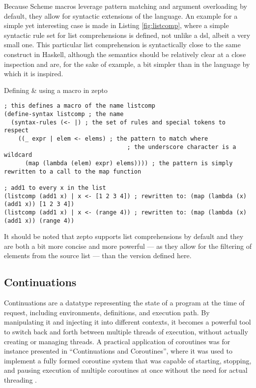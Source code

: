 \documentclass[oneside,11pt,xetex]{scrbook}
\begin{document}
Because Scheme macros leverage pattern matching and argument overloading by default,
they allow for syntactic extensions of the language. An example for a simple yet
interesting case is made in Listing \ref{fig:listcomp}, where a simple syntactic rule set
for list comprehensions is defined, not unlike a \gls{dsl}, albeit a very small one.
This particular list comprehension is syntactically close to the same construct in
Haskell, although the semantics should be relatively clear at a close inspection and
are, for the sake of example, a bit simpler than in the language by which it is inspired.

\begin{listing}[H]
\caption{Defining \& using a macro in zepto}
\begin{verbatim}
; this defines a macro of the name listcomp
(define-syntax listcomp ; the name
  (syntax-rules (<- |) ; the set of rules and special tokens to respect
    ((_ expr | elem <- elems) ; the pattern to match where
                                   ; the underscore character is a wildcard
      (map (lambda (elem) expr) elems)))) ; the pattern is simply rewritten to a call to the map function

; add1 to every x in the list
(listcomp (add1 x) | x <- [1 2 3 4]) ; rewritten to: (map (lambda (x) (add1 x)) [1 2 3 4])
(listcomp (add1 x) | x <- (range 4)) ; rewritten to: (map (lambda (x) (add1 x)) (range 4))
\end{verbatim}
\label{fig:listcomp}
\end{listing}

It should be noted that zepto supports list comprehensions by default and they are
both a bit more concise and more powerful --- as they allow for the filtering of
elements from the source list --- than the version defined here.

\subsection{Continuations}
\label{continuation}

Continuations are a datatype representing the state of a program at the time of
request, including environments, definitions, and execution path. By manipulating
it and injecting it into different contexts, it becomes a powerful tool to switch
back and forth between multiple threads of execution, without actually creating
or managing threads. A practical application of coroutines was for instance
presented in ``Continuations and Coroutines'', where it was used to implement a fully formed
coroutine system that was capable of starting, stopping, and pausing execution
of multiple coroutines at once without the need for actual threading \parencite{COR}.
\end{document}

